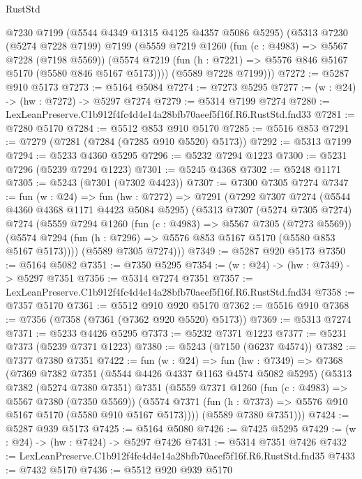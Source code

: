 \begin{lexlean}{RustStd}
\begin{coremodule}
      @7230
      @7199
      (@5544 @4349 @1315 @4125 @4357 @5086 @5295)
      (@5313
        @7230
        (@5274 @7228 @7199)
        @7199
        (@5559
          @7219
          @1260
          (fun (c : @4983) => @5567 @7228 (@7198 @5569))
          (@5574 @7219 (fun (h : @7221) => @5576 @846 @5167 @5170 (@5580 @846 @5167 @5173))))
        (@5589 @7228 @7199)))
@7272 := @5287 @910 @5173
@7273 := @5164 @5084
@7274 := @7273 @5295
@7277 := (w : @24) -> (hw : @7272) -> @5297 @7274
@7279 := @5314 @7199 @7274
@7280 := LexLeanPreserve.C1b912f4fc4d4e14a28bfb70aeef5f16f.R6.RustStd.fnd33
@7281 := @7280 @5170
@7284 := @5512 @853 @910 @5170
@7285 := @5516 @853
@7291 := @7279 (@7281 (@7284 (@7285 @910 @5520) @5173))
@7292 := @5313 @7199
@7294 := @5233 @4360 @5295
@7296 := @5232 @7294 @1223
@7300 := @5231 @7296 (@5239 @7294 @1223)
@7301 := @5245 @4368
@7302 := @5248 @1171
@7305 := @5243 (@7301 (@7302 @4423))
@7307 := @7300 @7305 @7274
@7347 := fun (w : @24) =>
  fun (hw : @7272) =>
  @7291
    (@7292
      @7307
      @7274
      (@5544 @4360 @4368 @1171 @4423 @5084 @5295)
      (@5313
        @7307
        (@5274 @7305 @7274)
        @7274
        (@5559
          @7294
          @1260
          (fun (c : @4983) => @5567 @7305 (@7273 @5569))
          (@5574 @7294 (fun (h : @7296) => @5576 @853 @5167 @5170 (@5580 @853 @5167 @5173))))
        (@5589 @7305 @7274)))
@7349 := @5287 @920 @5173
@7350 := @5164 @5082
@7351 := @7350 @5295
@7354 := (w : @24) -> (hw : @7349) -> @5297 @7351
@7356 := @5314 @7274 @7351
@7357 := LexLeanPreserve.C1b912f4fc4d4e14a28bfb70aeef5f16f.R6.RustStd.fnd34
@7358 := @7357 @5170
@7361 := @5512 @910 @920 @5170
@7362 := @5516 @910
@7368 := @7356 (@7358 (@7361 (@7362 @920 @5520) @5173))
@7369 := @5313 @7274
@7371 := @5233 @4426 @5295
@7373 := @5232 @7371 @1223
@7377 := @5231 @7373 (@5239 @7371 @1223)
@7380 := @5243 (@7150 (@6237 @4574))
@7382 := @7377 @7380 @7351
@7422 := fun (w : @24) =>
  fun (hw : @7349) =>
  @7368
    (@7369
      @7382
      @7351
      (@5544 @4426 @4337 @1163 @4574 @5082 @5295)
      (@5313
        @7382
        (@5274 @7380 @7351)
        @7351
        (@5559
          @7371
          @1260
          (fun (c : @4983) => @5567 @7380 (@7350 @5569))
          (@5574 @7371 (fun (h : @7373) => @5576 @910 @5167 @5170 (@5580 @910 @5167 @5173))))
        (@5589 @7380 @7351)))
@7424 := @5287 @939 @5173
@7425 := @5164 @5080
@7426 := @7425 @5295
@7429 := (w : @24) -> (hw : @7424) -> @5297 @7426
@7431 := @5314 @7351 @7426
@7432 := LexLeanPreserve.C1b912f4fc4d4e14a28bfb70aeef5f16f.R6.RustStd.fnd35
@7433 := @7432 @5170
@7436 := @5512 @920 @939 @5170

\end{coremodule}
\end{lexlean}
